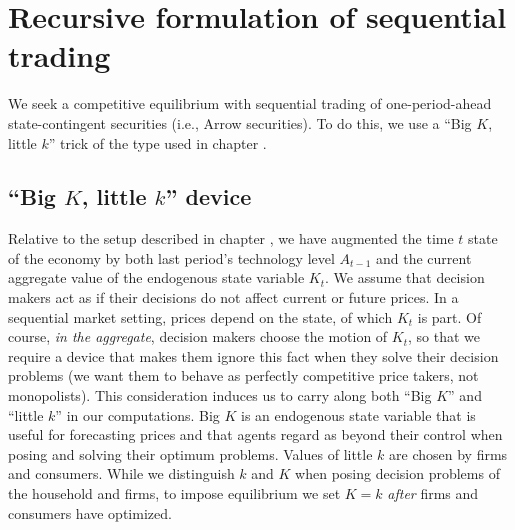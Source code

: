 \section{Recursive formulation of sequential trading}\label{sec:bigKlittlek}%
We seek a competitive equilibrium with sequential trading of
one-period-ahead state-contingent securities (i.e., Arrow securities).
To do this, we  use a ``Big $K$, little $k$'' trick of the type used in
chapter . %


\subsection{``Big $K$, little $k$'' device}
Relative to the setup described in chapter , we have
augmented the time $t$ state of the economy by both last period's
technology level $A_{t-1}$ and the current aggregate value of
the endogenous state variable $K_t$.  We assume that decision
makers act as if their decisions do not affect current or future prices. In a
sequential market setting, prices depend on the state, of which
$K_t$ is part. Of course, {\it in the aggregate\/}, decision
makers choose the motion of $K_t$, so that we  require a device
that makes them ignore this fact when they solve their decision
problems (we want them to behave as perfectly competitive price
takers, not monopolists). This consideration induces us to carry
along both ``Big $K$'' and ``little $k$'' in our computations.
Big $K$ is  an endogenous
state variable
that is useful for forecasting  prices and that agents
regard as beyond their control when posing and  solving their optimum
problems. Values of little $k$ are chosen by firms and consumers.
While we distinguish $k$ and $K$
 when posing  decision problems of the household and firms,
to impose equilibrium we set $K=k$ {\it after\/} firms
and consumers have optimized.


